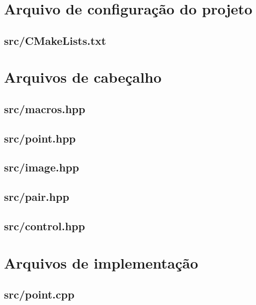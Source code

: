 \appendix

\label{codigofonte}

\section{Arquivo de configuração do projeto}
\subsection{src/CMakeLists.txt}


\section{Arquivos de cabeçalho}
\subsection{src/macros.hpp}

\subsection{src/point.hpp}

\subsection{src/image.hpp}

\subsection{src/pair.hpp}

\subsection{src/control.hpp}


\section{Arquivos de implementação}
\subsection{src/point.cpp}

